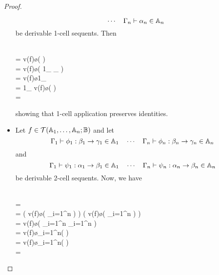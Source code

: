 \documentclass{robinthesisdraft}
\begin{document}
\begin{proof}
\begin{itemize}
\[			\quad\cdots\quad
			\Gamma_{n}\vdash \alpha_{n}\in \mathbb{A}_{n}
		\]
		be derivable 1-cell sequents. Then
		\begin{mmulti}[.5em]
			\\= v(f)\o\Bigl(
				\tn\cdots\tn
			\Bigr)
			\\= v(f)\o\Bigl(
				1_{}
				\tn\cdots{}_{}
			\Bigr)
			\\= v(f)\o1_{
				\tn\cdots\tn
			}
			\\= 1_{
				v(f)\o(
					\tn\cdots\tn
				)
			}
			\\= 
		\end{mmulti}
		showing that 1-cell application preserves identities.
	\item Let $f\in{\mathcal{T}}(\mathbb{A}_{1},\dots,\mathbb{A}_{n};\mathbb{B})$ and let
		\[
			\Gamma_{1}\vdash\phi_{1}: \beta_{1}\to\gamma_{1}\in\mathbb{A}_{1}
			\quad\cdots\quad
			\Gamma_{n}\vdash\phi_{n}: \beta_{n}\to\gamma_{n}\in\mathbb{A}_{n}
		\]
		and
		\[
			\Gamma_{1}\vdash\psi_{1}: \alpha_{1}\to\beta_{1}\in\mathbb{A}_{1}
			\quad\cdots\quad
			\Gamma_{n}\vdash\psi_{n}: \alpha_{n}\to\beta_{n}\in\mathbb{A}_{n}
		\]
		be derivable 2-cell sequents. Now, we have
		\begin{mmulti}[1em]
			\\=
			\cdot
			\\=
			\bigl( v(f)\o (
				\Tn_{i=1}^{n}
			) \bigr)
			\cdot
			\bigl( v(f)\o (
				\Tn_{i=1}^{n}
			) \bigr)
			\\=
			v(f)\o\bigl(
				\Tn_{i=1}^{n}
				\cdot
				\Tn_{i=1}^{n}
			\bigr)
			\\=
			v(f)\o\Tn_{i=1}^{n}\bigl(
				\cdot{}
			\bigr)
			\\=
			v(f)\o\Tn_{i=1}^{n}\bigl(
			\bigr)
			\\=

\end{mmulti}
\end{itemize}
\end{proof}
\end{document}
